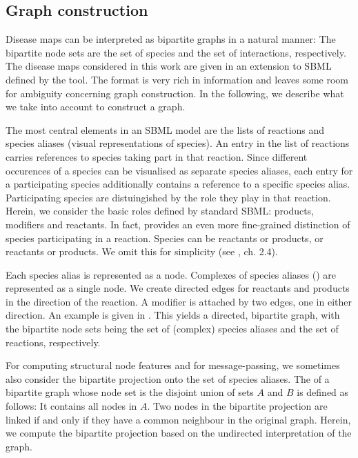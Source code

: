 \documentclass[
	fontsize=10pt, %
	twoside=false, %
	secnumdepth=1, %
  toc=indentunnumbered %
]{kaobook}
\begin{document}
\subsection{Graph construction}
\label{sec:graph-interpretation}
Disease maps can be interpreted as bipartite graphs in a natural manner: The
bipartite node sets are the set of species and the set of interactions, respectively.
The disease maps considered in this work are given in an extension
to SBML defined by the  tool. The format is very rich in
information and leaves some room for ambiguity concerning graph construction. In
the following, we describe what we take into account to construct a graph.

The most central elements in an SBML model are the lists of reactions and
species aliases (visual representations of species). 
%
An entry in the list of reactions carries references to species taking part in
that reaction. Since different occurences of a species can be visualised as
separate species aliases, each entry for a participating species additionally
contains a reference to a specific species alias. Participating species are
distuingished by the role they play in that reaction. Herein, we consider the
basic roles defined by standard SBML: products, modifiers and reactants. In
fact,  provides an even more fine-grained distinction of
species participating in a reaction. Species can be  reactants or
products,  or  reactants or products. We omit
this for simplicity (see \cite{_CellDesignerExtensionTag_2010}, ch. 2.4).

Each species alias is represented as a node. Complexes of species aliases
() are represented as a single node. We create
directed edges for reactants and products in the direction of the reaction. A
modifier is attached by two edges, one in either direction. An example is given
in . This yields a directed, bipartite graph, with
the bipartite node sets being the set of (complex) species aliases and the set
of reactions, respectively.

For computing structural node features and for message-passing, we sometimes
also consider the bipartite projection onto the set of species aliases. The
 of a bipartite graph whose node set is the
disjoint union of sets $A$ and $B$ is defined as follows: It contains all nodes
in $A$. Two nodes in the bipartite projection are linked if and only if they
have a common neighbour in the original graph. Herein, we compute the bipartite
projection based on the undirected interpretation of the graph.
\end{document}
